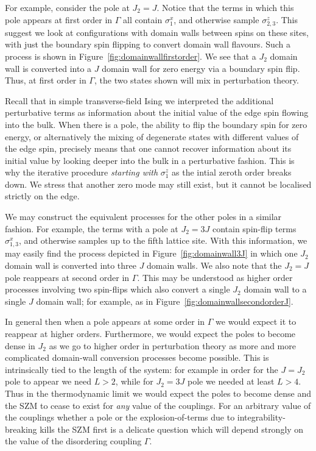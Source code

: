 \documentclass [a4paper, 11pt]{article}
\begin{document}
For example, consider the pole at $J_2 = J$. Notice that the terms in which this pole appears at first order in $\Gamma$ all contain $\sigma^x_1$, and otherwise sample $\sigma^z_{2,3}$. This suggest we look at configurations with domain walls between spins on these sites, with just the boundary spin flipping to convert domain wall flavours. Such a process is shown in Figure~\ref{fig:domainwallfirstorder}. We see that a $J_2$ domain wall is converted into a $J$ domain wall for zero energy via a boundary spin flip. Thus, at first order in $\Gamma$, the two states shown will mix in perturbation theory. 

Recall that in simple transverse-field Ising we interpreted the additional perturbative terms as information about the initial value of the edge spin flowing into the bulk. When there is a pole, the ability to flip the boundary spin for zero energy, or alternatively the mixing of degenerate states with different values of the edge spin, precisely means that one cannot recover information about its initial value by looking deeper into the bulk in a perturbative fashion. This is why the iterative procedure \emph{starting with} $\sigma^z_1$ as the intial zeroth order breaks down. We stress that another zero mode may still exist, but it cannot be localised strictly on the edge.

We may construct the equivalent processes for the other poles in a similar fashion. For example, the terms with a pole at $J_2 = 3J$ contain spin-flip terms $\sigma^x_{1,3}$, and otherwise samples up to the fifth lattice site. With this information, we may easily find the process depicted in Figure~\ref{fig:domainwall3J} in which one $J_2$ domain wall is converted into three $J$ domain walls. We also note that the $J_2 = J$ pole reappears at second order in $\Gamma$. This may be understood as higher order processes involving two spin-flips which also convert a single $J_2$ domain wall to a single $J$ domain wall; for example, as in Figure~\ref{fig:domainwallsecondorderJ}.

In general then when a pole appears at some order in $\Gamma$ we would expect it to reappear at higher orders. Furthermore, we would expect the poles to become dense in $J_2$ as we go to higher order in perturbation theory as more and more complicated domain-wall conversion processes become possible. This is intrinsically tied to the length of the system: for example in order for the $J=J_2$ pole to appear we need $L>2$, while for $J_2 = 3 J$ pole we needed at least $L>4$. Thus in the thermodynamic limit we would expect the poles to become dense and the SZM to cease to exist for \emph{any} value of the couplings. For an arbitrary value of the couplings whether a pole or the explosion-of-terms due to integrability-breaking kills the SZM first is a delicate question which will depend strongly on the value of the disordering coupling $\Gamma$.
\end{document}
